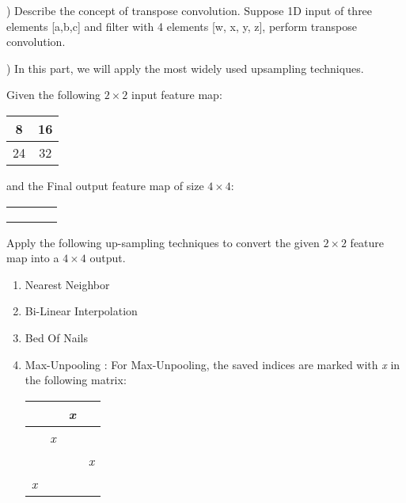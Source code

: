 \documentclass[DIN, pagenumber=false, fontsize=11pt, parskip=half]{scrartcl}
\newcommand{\mysubsection}[2]{\romannumeral #1) #2}
\begin{document}
\mysubsection{2}{Describe the concept of transpose convolution. Suppose 1D input of three elements [a,b,c] and filter with 4 elements [w, x, y, z], perform transpose convolution.}

\newpage
\mysubsection{3}{In this part, we will apply the most widely used upsampling techniques.}

Given the following $2\times2$ input feature map:
\begin{table}[h!]
\centering
\begin{tabular}{|c|c|}
\hline
8 & 16 \\
\hline
24 & 32 \\ 
\hline
\end{tabular}
\end{table}

and the Final output feature map of size $4 \times 4$:
\begin{table}[h!]
\centering
\begin{tabular}{|c|c|c|c|}
\hline
 &  &  &  \\
 \hline
 &  &  &   \\
 \hline
 &  &  &   \\ 
 \hline
 &  &  &   \\
\hline
\end{tabular}
\end{table}

Apply the following up-sampling techniques to convert the given $2\times2$ feature map into a $4\times4$ output.
\begin{enumerate}
    \item Nearest Neighbor
    \item Bi-Linear Interpolation
    \item Bed Of Nails
    \item Max-Unpooling : For Max-Unpooling, the saved indices are marked with \textit{x }in the following matrix:
 \begin{table}[h!]
\centering
\begin{tabular}{|c|c|c|c|}
\hline
 &  &  \textit{x }&  \\
 \hline
 &  \textit{x }&  &   \\
 \hline
 &  &  &\textit{x }\\ 
 \hline
 \textit{x }&  &  &   \\
\hline
\end{tabular}
\end{table}

\end{enumerate}
\end{document}
